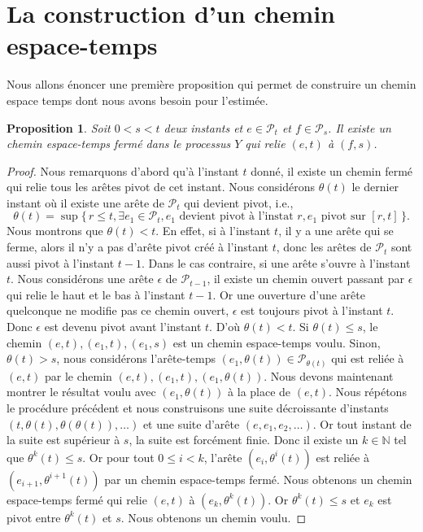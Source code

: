 \documentclass[titlepage,a4paper,12pt]{article}
\newcounter{prop}
\newtheorem{propo}[prop]{Proposition}
\begin{document}
\section{La construction d'un chemin espace-temps}
Nous allons énoncer une première proposition qui permet de construire un chemin espace temps dont nous avons besoin pour l'estimée.

\begin{propo} \label{stc}Soit $0<s<t$ deux instants et $e\in \mathcal{P}_t$ et $f \in \mathcal{P}_s$. Il existe un chemin espace-temps fermé dans le processus $Y$ qui relie $(e,t)$ à $(f,s)$.
\end{propo}

\begin{proof}
Nous remarquons d'abord qu'à l'instant $t$ donné, il existe un chemin fermé qui relie tous les arêtes pivot de cet instant. Nous considérons $\theta(t)$ le dernier instant où il existe une arête de $\mathcal{P}_t$ qui devient pivot, i.e.,
$$ \theta(t) = \sup \big\{ \,r\leqslant t, \exists e_1 \in \mathcal{P}_t, e_1 \text{ devient pivot à l'instat } r,e_1\text{ pivot sur }[r,t]\, \big\}.
$$
Nous montrons que $\theta(t)< t$. En effet, si à l'instant $t$, il y a une arête qui se ferme, alors il n'y a pas d'arête pivot créé à l'instant $t$, donc les arêtes de $\mathcal{P}_t$ sont aussi pivot à l'instant $t-1$. Dans le cas contraire, si une arête s'ouvre à l'instant $t$. Nous considérons une arête $\epsilon$ de $\mathcal{P}_{t-1}$, il existe un chemin ouvert passant par $\epsilon$ qui relie le haut et le bas à l'instant $t-1$. Or une ouverture d'une arête quelconque ne modifie pas ce chemin ouvert, $\epsilon$ est toujours pivot à l'instant $t$. Donc $\epsilon$ est devenu pivot avant l'instant $t$. D'où $\theta(t)< t$.
Si $\theta(t)\leqslant s$, le chemin $(e,t),(e_1,t),(e_1,s)$ est un chemin espace-temps voulu. Sinon, $\theta(t)> s$, nous considérons l'arête-temps $(e_1,\theta(t))\in \mathcal{P}_{\theta(t)}$ qui est reliée à $(e,t)$ par le chemin $(e,t),(e_1,t),(e_1,\theta(t))$. Nous devons maintenant montrer le résultat voulu avec $(e_1,\theta(t))$ à la place de $(e,t)$. Nous répétons le procédure précédent et nous construisons une suite décroissante d'instants $(t,\theta(t),\theta(\theta(t)),\dots)$ et une suite d'arête $(e,e_1,e_2,\dots)$. Or tout instant de la suite est supérieur à $s$, la suite est forcément finie. Donc il existe un $k\in\mathbb{N}$ tel que $\theta^k(t)\leqslant s$. Or pour tout $0\leqslant i < k$, l'arête $(e_i,\theta^i(t))$ est reliée à $(e_{i+1},\theta^{i+1}(t))$ par un chemin espace-temps fermé. Nous obtenons un chemin espace-temps fermé qui relie $(e,t)$ à $(e_k,\theta^k(t))$. Or $\theta^k(t)\leqslant s$ et $e_k$ est pivot entre $\theta^k(t)$ et $s$. Nous obtenons un chemin voulu.
\end{proof}
\end{document}
